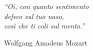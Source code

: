 \newlength\longest

\clearpage

\thispagestyle{empty}
\null\vfill

\settowidth{}
\begin{center}
    \parbox{\longest}{%
        \raggedright{\LARGE\itshape%
            ``Oi, con quanto sentimento\\
            defeco sul tuo naso,\\
            così che ti coli sul mento.''\par\bigskip
        }
        \raggedleft\Large{Wolfgang Amadeus Mozart}\par%
    }
\end{center}


\vfill\vfill

\clearpage